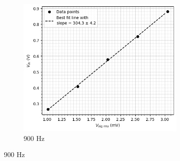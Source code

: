\begin{figure}[H]
    \bigskip
    \begin{subfigure}{\linewidth}
    \includegraphics[width=0.9\textwidth]{images/b3.png}
    \caption{900 Hz}
    \end{subfigure}
    \end{figure}
    
